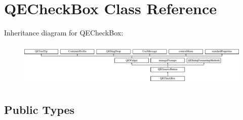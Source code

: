 \hypertarget{classQECheckBox}{
\section{QECheckBox Class Reference}
\label{classQECheckBox}
}
Inheritance diagram for QECheckBox:\begin{figure}[H]
\begin{center}
\leavevmode
\includegraphics[height=2.097378cm]{classQECheckBox}
\end{center}
\end{figure}
\subsection*{Public Types}
